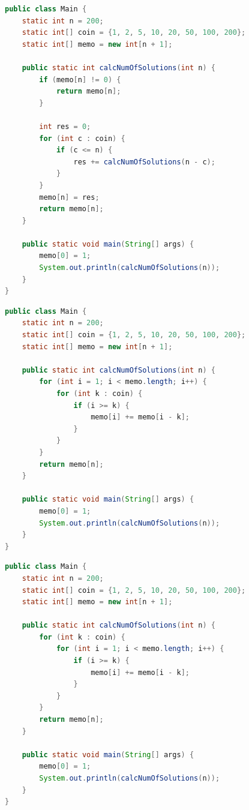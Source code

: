 \documentclass[12pt]{ctexart}
\begin{document}
\newpage
\begin{lstlisting}[language={java},caption={Algorithm 2}]
public class Main {
    static int n = 200;
    static int[] coin = {1, 2, 5, 10, 20, 50, 100, 200};
    static int[] memo = new int[n + 1];

    public static int calcNumOfSolutions(int n) {
        if (memo[n] != 0) {
            return memo[n];
        }

        int res = 0;
        for (int c : coin) {
            if (c <= n) {
                res += calcNumOfSolutions(n - c);
            }
        }
        memo[n] = res;
        return memo[n];
    }

    public static void main(String[] args) {
        memo[0] = 1;
        System.out.println(calcNumOfSolutions(n));
    }
}
\end{lstlisting}

\newpage
\begin{lstlisting}[language={java},caption={Algorithm 3}]
public class Main {
    static int n = 200;
    static int[] coin = {1, 2, 5, 10, 20, 50, 100, 200};
    static int[] memo = new int[n + 1];

    public static int calcNumOfSolutions(int n) {
        for (int i = 1; i < memo.length; i++) {
            for (int k : coin) {
                if (i >= k) {
                    memo[i] += memo[i - k];
                }
            }
        }
        return memo[n];
    }

    public static void main(String[] args) {
        memo[0] = 1;
        System.out.println(calcNumOfSolutions(n));
    }
}
\end{lstlisting}

\newpage
\begin{lstlisting}[language={java},caption={Algorithm 4}]
public class Main {
    static int n = 200;
    static int[] coin = {1, 2, 5, 10, 20, 50, 100, 200};
    static int[] memo = new int[n + 1];

    public static int calcNumOfSolutions(int n) {
        for (int k : coin) {
            for (int i = 1; i < memo.length; i++) {
                if (i >= k) {
                    memo[i] += memo[i - k];
                }
            }
        }
        return memo[n];
    }

    public static void main(String[] args) {
        memo[0] = 1;
        System.out.println(calcNumOfSolutions(n));
    }
}
\end{lstlisting}
\end{document}
